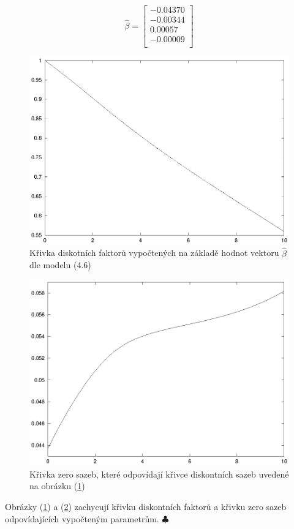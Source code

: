 \documentclass[a4paper]{book}
\begin{document}
\begin{equation*}
\hat{\beta} = 
\begin{bmatrix}
-0.04370 \\
-0.00344 \\
 0.00057 \\
-0.00009 \\
\end{bmatrix}
\end{equation*}
\begin{figure}
  \centering
  \includegraphics[scale=0.75]{df.eps}
  \caption{Křivka diskotních faktorů vypočtených na základě hodnot vektoru $\hat{\beta}$ dle modelu (4.6)}
  \label{df}
\end{figure}
\begin{figure}
  \centering
  \includegraphics[scale=0.75]{zero.eps}
  \caption{Křivka zero sazeb, které odpovídají křivce diskontních sazeb uvedené na obrázku (\ref{df})}
  \label{zero}
\end{figure}
Obrázky (\ref{df}) a (\ref{zero}) zachycují křivku diskontních faktorů a křivku zero sazeb odpovídajících vypočteným parametrům. $\clubsuit$
\end{document}
